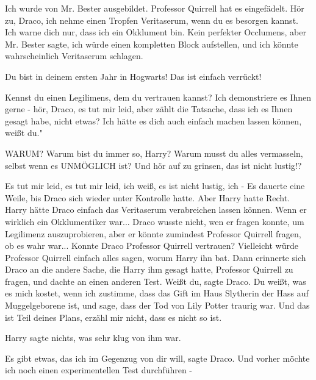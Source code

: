 \glqq{}Ich wurde von Mr. Bester ausgebildet. Professor Quirrell hat es
eingefädelt. Hör zu, Draco, ich nehme einen Tropfen Veritaserum, wenn du es
besorgen kannst. Ich warne dich nur, dass ich ein Okklument bin. Kein perfekter
Occlumens, aber Mr. Bester sagte, ich würde einen kompletten Block aufstellen,
und ich könnte wahrscheinlich Veritaserum schlagen.\grqq{}

\glqq{}Du bist in deinem ersten Jahr in Hogwarts! Das ist einfach
verrückt!\grqq{}

\glqq{}Kennst du einen Legilimens, dem du vertrauen kannst? Ich demonstriere es
Ihnen gerne - hör, Draco, es tut mir leid, aber zählt die Tatsache, dass ich es
Ihnen gesagt habe, nicht etwas? Ich hätte es dich auch einfach machen lassen
können, weißt du."

\glqq{}WARUM? Warum bist du immer so, Harry? Warum musst du alles vermasseln,
selbst wenn es UNMÖGLICH ist? Und hör auf zu grinsen, das ist nicht
lustig!?\grqq{}

\glqq{}Es tut mir leid, es tut mir leid, ich weiß, es ist nicht lustig, ich
-\grqq{} Es dauerte eine Weile, bis Draco sich wieder unter Kontrolle hatte.
Aber Harry hatte Recht. Harry hätte Draco einfach das Veritaserum verabreichen
lassen können. Wenn er wirklich ein Okklumentiker war... Draco wusste nicht, wen
er fragen konnte, um Legilimenz auszuprobieren, aber er könnte zumindest
Professor Quirrell fragen, ob es wahr war... Konnte Draco Professor Quirrell
vertrauen? Vielleicht würde Professor Quirrell einfach alles sagen, worum Harry
ihn bat. Dann erinnerte sich Draco an die andere Sache, die Harry ihm gesagt
hatte, Professor Quirrell zu fragen, und dachte an einen anderen Test. \glqq
Weißt du\grqq{}, sagte Draco. \glqq{}Du weißt, was es mich kostet, wenn ich
zustimme, dass das Gift im Haus Slytherin der Hass auf Muggelgeborene ist, und
sage, dass der Tod von Lily Potter traurig war. Und das ist Teil deines Plans,
erzähl mir nicht, dass es nicht so ist.\grqq{}

Harry sagte nichts, was sehr klug von ihm war.

\glqq{}Es gibt etwas, das ich im Gegenzug von dir will\grqq{}, sagte Draco. \glqq
Und vorher möchte ich noch einen experimentellen Test durchführen -\grqq{}

